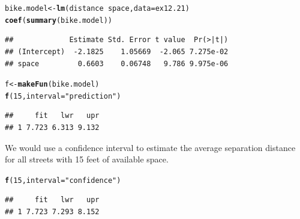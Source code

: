 \documentclass[twoside]{book}\usepackage[]{graphicx}\usepackage[]{xcolor}
\makeatletter
\newcommand{\hlnum}[1]{\textcolor[rgb]{0.686,0.059,0.569}{#1}}%
\newcommand{\hlstr}[1]{\textcolor[rgb]{0.192,0.494,0.8}{#1}}%
\newcommand{\hlopt}[1]{\textcolor[rgb]{0,0,0}{#1}}%
\newcommand{\hlstd}[1]{\textcolor[rgb]{0.345,0.345,0.345}{#1}}%
\newcommand{\hlkwb}[1]{\textcolor[rgb]{0.69,0.353,0.396}{#1}}%
\newcommand{\hlkwc}[1]{\textcolor[rgb]{0.333,0.667,0.333}{#1}}%
\newcommand{\hlkwd}[1]{\textcolor[rgb]{0.737,0.353,0.396}{\textbf{#1}}}%
\newenvironment{kframe}{%
 \def\at@end@of@kframe{}%
 \ifinner\ifhmode%
  \def\at@end@of@kframe{\end{minipage}}%
  \begin{minipage}{\columnwidth}%
 \fi\fi%
 \def\FrameCommand##1{\hskip\@totalleftmargin \hskip-\fboxsep
 \colorbox{shadecolor}{##1}\hskip-\fboxsep
     \hskip-\linewidth \hskip-\@totalleftmargin \hskip\columnwidth}%
 \MakeFramed {\advance\hsize-\width
   \@totalleftmargin\z@ \linewidth\hsize
   \@setminipage}}%
 {\par\unskip\endMakeFramed%
 \at@end@of@kframe}
\newenvironment{knitrout}{}{} %
\makeatother
\begin{document}
\begin{solution}
\begin{knitrout}
\color{fgcolor}\begin{kframe}
\begin{alltt}
\hlstd{bike.model} \hlkwb{<-} \hlkwd{lm}\hlstd{( distance} \hlopt{~} \hlstd{space,} \hlkwc{data} \hlstd{= ex12.21 )}
\hlkwd{coef}\hlstd{(}\hlkwd{summary}\hlstd{(bike.model))}
\end{alltt}
\begin{verbatim}
##             Estimate Std. Error t value  Pr(>|t|)
## (Intercept)  -2.1825    1.05669  -2.065 7.275e-02
## space         0.6603    0.06748   9.786 9.975e-06
\end{verbatim}
\begin{alltt}
\hlstd{f} \hlkwb{<-} \hlkwd{makeFun}\hlstd{(bike.model)}
\hlkwd{f}\hlstd{(} \hlnum{15}\hlstd{,} \hlkwc{interval} \hlstd{=} \hlstr{"prediction"} \hlstd{)}
\end{alltt}
\begin{verbatim}
##     fit   lwr   upr
## 1 7.723 6.313 9.132
\end{verbatim}
\end{kframe}
\end{knitrout}
We would use a confidence interval to estimate the average separation distance 
for all streets with 15 feet of available space.
\begin{knitrout}
\color{fgcolor}\begin{kframe}
\begin{alltt}
\hlkwd{f}\hlstd{(} \hlnum{15}\hlstd{,} \hlkwc{interval} \hlstd{=} \hlstr{"confidence"} \hlstd{)}
\end{alltt}
\begin{verbatim}
##     fit   lwr   upr
## 1 7.723 7.293 8.152
\end{verbatim}
\end{kframe}
\end{knitrout}
\end{solution}
\end{document}
